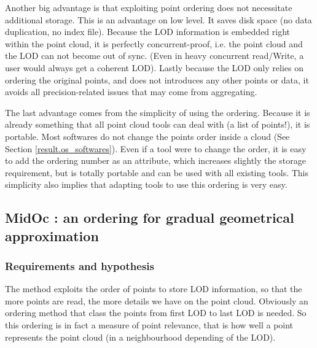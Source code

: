 			Another big advantage is that exploiting point ordering does not necessitate additional storage.
			This is an advantage on low level. It saves disk space (no data duplication, no index file). Because the LOD information is embedded right within the point cloud, it is perfectly concurrent-proof, i.e. the point cloud and the LOD can not become out of sync.
			(Even in heavy concurrent read/Write, a user would always get a coherent LOD).
			Lastly because the LOD only relies on ordering the original points, and does not introduces any other points or data, it avoids all precision-related issues that may come from aggregating.
			
			The last advantage comes from the simplicity of using the ordering. 
			Because it is already something that all point cloud tools can deal with (a list of points!), it is portable. Most softwares do not change the points order inside a cloud (See Section \ref{result.os_softwares}).
			Even if a tool were to change the order, it is easy to add the ordering number as an attribute, which increases slightly the storage requirement, but is totally portable and can be used with all existing tools.
			This simplicity also implies that adapting tools to use this ordering is very easy.
	
	
	\subsection{MidOc : an ordering for gradual geometrical approximation}
		\label{method:midoc}
		\subsubsection{Requirements and hypothesis}
		\label{method.midoc.hypothesis}
		The method exploits the order of points to store LOD information, so that the more points are read, the more details we have on the point cloud.
		Obviously an ordering method that class the points from first LOD to last LOD is needed.
		So this ordering is in fact a measure of point relevance, that is how well a point represents the point cloud (in a neighbourhood depending of the LOD).
		
